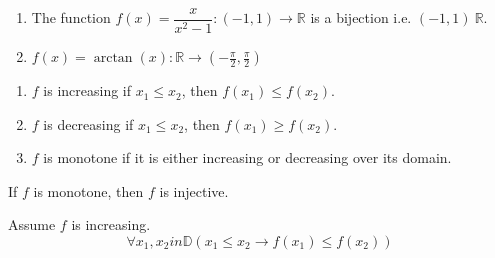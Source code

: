 \documentclass[letterpaper, 12pt]{article}
\newenvironment{proof}[1][Proof]{\begin{trivlist}
\item[\hskip \labelsep {\bfseries #1}]}{\end{trivlist}}
\newenvironment{definition}[1][Definition]{\begin{trivlist}
\item[\hskip \labelsep {\bfseries #1}]}{\end{trivlist}}
\newenvironment{example}[1][Example]{\begin{trivlist}
\item[\hskip \labelsep {\bfseries #1}]}{\end{trivlist}}
\newenvironment{remark}[1][Remark]{\begin{trivlist}
\item[\hskip \labelsep {\bfseries #1}]}{\end{trivlist}}
\newcommand{\then}{\rightarrow}
\newcommand{\reals}{\mathbb{R}}
\begin{document}
    \begin{example}
        \hfill
        \begin{enumerate}
            \item The function $f(x) = \dfrac{x}{x^2 - 1} : (-1, 1) \rightarrow \reals$ is a 
            bijection i.e. $(-1, 1) ~ \reals$.
            \item $f(x) = \arctan(x) : \reals \rightarrow (-\frac{\pi}{2}, \frac{\pi}{2})$
        \end{enumerate}
    \end{example}
    \begin{definition}
        \hfill
        \begin{enumerate}
            \item $f$ is increasing if $x_1 \le x_2$, then $f(x_1) \le f(x_2)$.
            \item $f$ is decreasing if $x_1 \le x_2$, then $f(x_1) \ge f(x_2)$.
            \item $f$ is monotone if it is either increasing or decreasing over its domain.
        \end{enumerate}
    \end{definition}
    \begin{remark}
        If $f$ is monotone, then $f$ is injective.
    \end{remark}
    \begin{proof}
        Assume $f$ is increasing.
        \[\forall x_1, x_2in \mathbb{D} (x_1 \le x_2 \then f(x_1) \le f(x_2))\]
    \end{proof}
\end{document}
